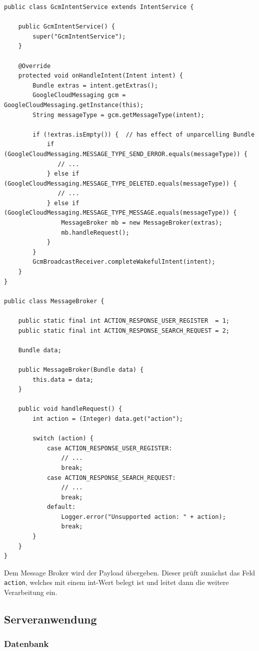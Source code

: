 \begin{lstlisting}[label=ls:messagebroker,caption=Intent Service mit Message Broker]
public class GcmIntentService extends IntentService {

    public GcmIntentService() {
        super("GcmIntentService");
    }

    @Override
    protected void onHandleIntent(Intent intent) {
        Bundle extras = intent.getExtras();
        GoogleCloudMessaging gcm = GoogleCloudMessaging.getInstance(this);
        String messageType = gcm.getMessageType(intent);

        if (!extras.isEmpty()) {  // has effect of unparcelling Bundle
            if (GoogleCloudMessaging.MESSAGE_TYPE_SEND_ERROR.equals(messageType)) {
               // ...
            } else if (GoogleCloudMessaging.MESSAGE_TYPE_DELETED.equals(messageType)) {
               // ...
            } else if (GoogleCloudMessaging.MESSAGE_TYPE_MESSAGE.equals(messageType)) {
            	MessageBroker mb = new MessageBroker(extras);
            	mb.handleRequest();
            }
        }
        GcmBroadcastReceiver.completeWakefulIntent(intent);
    }
}

public class MessageBroker {

	public static final int ACTION_RESPONSE_USER_REGISTER  = 1;
	public static final int ACTION_RESPONSE_SEARCH_REQUEST = 2;

	Bundle data;

	public MessageBroker(Bundle data) {
		this.data = data;
	}

	public void handleRequest() {
		int action = (Integer) data.get("action");

		switch (action) {
			case ACTION_RESPONSE_USER_REGISTER:
				// ...
				break;
			case ACTION_RESPONSE_SEARCH_REQUEST:
				// ...
				break;
			default:
				Logger.error("Unsupported action: " + action);
				break;
		}
	}
}
\end{lstlisting}

Dem Message Broker wird der Payload übergeben. Dieser prüft zunächst das Feld \texttt{action}, welches mit einem int-Wert belegt ist und leitet dann die weitere Verarbeitung ein.

\subsection{Serveranwendung}

\subsubsection{Datenbank}

